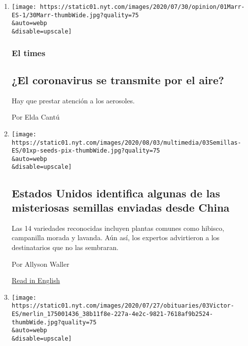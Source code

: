 \begin{enumerate}
\def\labelenumi{\arabic{enumi}.}
\item
  \href{/es/2020/08/04/espanol/coronavirus-bolsonaro-facebook.html}{}

  \texttt{[image: https://static01.nyt.com/images/2020/07/30/opinion/01Marr-ES-1/30Marr-thumbWide.jpg?quality=75\\\&auto=webp\\\&disable=upscale]}

  \hypertarget{el-times}{%
  \subsubsection{El times}\label{el-times}}

  \hypertarget{el-coronavirus-se-transmite-por-el-aire}{%
  \subsection{¿El coronavirus se transmite por el
  aire?}\label{el-coronavirus-se-transmite-por-el-aire}}

  Hay que prestar atención a los aerosoles.

  Por Elda Cantú
\item
  \href{/es/2020/08/03/espanol/estados-unidos/semillas-correo-china.html}{}

  \texttt{[image: https://static01.nyt.com/images/2020/08/03/multimedia/03Semillas-ES/01xp-seeds-pix-thumbWide.jpg?quality=75\\\&auto=webp\\\&disable=upscale]}

  \hypertarget{estados-unidos-identifica-algunas-de-las-misteriosas-semillas-enviadas-desde-china}{%
  \subsection{Estados Unidos identifica algunas de las misteriosas
  semillas enviadas desde
  China}\label{estados-unidos-identifica-algunas-de-las-misteriosas-semillas-enviadas-desde-china}}

  Las 14 variedades reconocidas incluyen plantas comunes como hibisco,
  campanilla morada y lavanda. Aún así, los expertos advirtieron a los
  destinatarios que no las sembraran.

  Por Allyson Waller

  \href{https://www.nytimes.com/2020/08/02/us/Seed-packets-China-USA.html}{Read
  in English}
\item
  \href{/es/2020/08/03/espanol/cultura/victor-victor-murio-coronavirus.html}{}

  \texttt{[image: https://static01.nyt.com/images/2020/07/27/obituaries/03Victor-ES/merlin\_175001436\_38b11f8e-227a-4e2c-9821-7618af9b2524-thumbWide.jpg?quality=75\\\&auto=webp\\\&disable=upscale]}


\end{enumerate}
